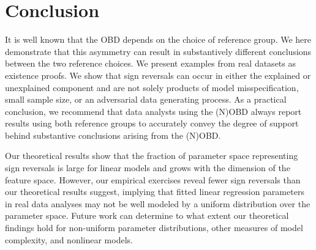 \section{Conclusion}
\label{sec:conclusion}

It is well known that the OBD depends on the choice of reference group. 
We here demonstrate that this asymmetry can result in substantively different conclusions between the two reference choices.
We present examples from real datasets as existence proofs. 
We show that sign reversals can occur in either the explained or unexplained component and are not solely products of model misspecification, small sample size, or an adversarial data generating process. 
As a practical conclusion, we recommend that data analysts using the (N)OBD always report results using both reference groups to accurately convey the degree of support behind substantive conclusions arising from the (N)OBD.

Our theoretical results show that the fraction of parameter space representing sign reversals is large for linear models and grows with the dimension of the feature space.
However, our empirical exercises reveal fewer sign reversals than our theoretical results suggest, implying that fitted linear regression parameters in real data analyses may not be well modeled by a uniform distribution over the parameter space. 
Future work can determine to what extent our theoretical findings hold for non-uniform parameter distributions, other measures of model complexity, and nonlinear models. 


